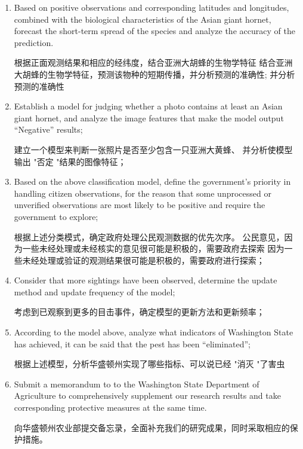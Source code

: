 \documentclass[12pt]{ctexart}
\begin{document}
\begin{enumerate}
    \item Based on positive observations and corresponding latitudes and longitudes, combined
    with the biological characteristics of the Asian giant hornet, forecast the short-term spread of
    the species and analyze the accuracy of the prediction.

    根据正面观测结果和相应的经纬度，结合亚洲大胡蜂的生物学特征
    结合亚洲大胡蜂的生物学特征，预测该物种的短期传播，并分析预测的准确性;
    并分析预测的准确性
    \item Establish a model for judging whether a photo contains at least an Asian giant hornet,
    and analyze the image features that make the model output “Negative” results;
    
    建立一个模型来判断一张照片是否至少包含一只亚洲大黄蜂、
    并分析使模型输出 "否定 "结果的图像特征；
    \item Based on the above classification model, define the government’s priority in handling
    citizen observations, for the reason that some unprocessed or unverified observations are most
    likely to be positive and require the government to explore;

    根据上述分类模式，确定政府处理公民观测数据的优先次序。
    公民意见，因为一些未经处理或未经核实的意见很可能是积极的，需要政府去探索
    因为一些未经处理或验证的观测结果很可能是积极的，需要政府进行探索；

    \item Consider that more sightings have been observed, determine the update method and
    update frequency of the model;

    考虑到已观察到更多的目击事件，确定模型的更新方法和更新频率；

    \item According to the model above, analyze what indicators of Washington State has achieved,
    it can be said that the pest has been “eliminated”;

    根据上述模型，分析华盛顿州实现了哪些指标、可以说已经 "消灭 "了害虫

    \item Submit a memorandum to to the Washington State Department of Agriculture to comprehensively 
    supplement our research results and take corresponding protective measures at the same time.

    向华盛顿州农业部提交备忘录，全面补充我们的研究成果，同时采取相应的保护措施。

\end{enumerate}
\end{document}
